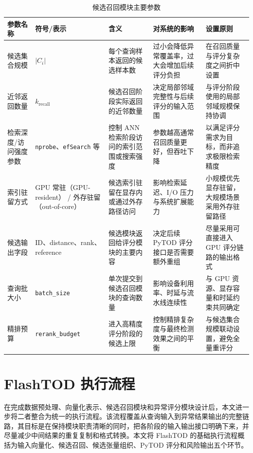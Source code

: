 \begin{table}[htbp]
  \caption{候选召回模块主要参数}
  \label{tab:recall-module-params}
  \centering
  \small
  \renewcommand{\arraystretch}{1.2}
  \begin{adjustbox}{max width=\linewidth}
  \begin{tabular}{P{2.6cm}P{2.7cm}P{3.2cm}P{4.2cm}P{4.2cm}}
    \toprule
    参数名称 & 符号/表示 & 含义 & 对系统的影响 & 设置原则\\
    \midrule
    候选集合规模 & $|C_i|$ & 每个查询样本返回的候选样本数 & 过小会降低异常覆盖率，过大会增加后续评分负担 & 在召回质量与评分复杂度之间折中设置\\
    近邻返回数量 & $k_{\mathrm{recall}}$ & 候选召回阶段实际返回的近邻数量 & 决定局部邻域完整性与后续评分的输入范围 & 与评分阶段使用的局部邻域规模保持协调\\
    检索深度/访问强度参数 & \texttt{nprobe}、\texttt{efSearch} 等 & 控制 ANN 检索阶段访问的索引范围或搜索强度 & 参数越高通常召回质量更好，但吞吐下降 & 以满足评分需求为目标，而非追求极限检索精度\\
    索引驻留方式 & GPU 常驻（GPU-resident） / 外存驻留（out-of-core） & 候选索引驻留在显存内或通过外存路径访问 & 影响检索延迟、I/O 压力与系统扩展能力 & 小规模优先显存驻留，大规模场景采用外存驻留路径\\
    候选输出字段 & ID、distance、rank、reference & 候选模块返回给评分模块的主要内容 & 决定后续 PyTOD 评分接口是否需要额外重组 & 尽量采用可直接进入 GPU 评分链路的输出格式\\
    查询批大小 & \texttt{batch\_size} & 单次提交到候选召回模块的查询数量 & 影响设备利用率、时延与流水线连续性 & 与 GPU 资源、显存容量和时延约束共同确定\\
    精排预算 & \texttt{rerank\_budget} & 进入高精度评分阶段的候选上限 & 控制精排复杂度与最终检测效果之间的平衡 & 与候选集合规模联动设置，避免全量重评分\\
    \bottomrule
  \end{tabular}
  \end{adjustbox}
\end{table}

\FloatBarrier

\section{FlashTOD 执行流程}

在完成数据预处理、向量化表示、候选召回模块和异常评分模块设计后，本文进一步将二者整合为统一的执行流程。该流程覆盖从查询输入到异常结果输出的完整链路，其目标是在保持模块职责清晰的同时，把各阶段的输入输出接口明确下来，并尽量减少中间结果的重复复制和格式转换。本文将 FlashTOD 的基础执行流程概括为输入向量化、候选召回、候选张量组织、PyTOD 评分和风险输出五个环节。

